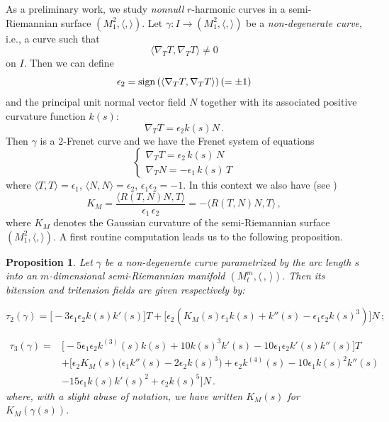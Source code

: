 \documentclass[11pt]{amsart}
\theoremstyle{plain}
\newtheorem{proposition}  [theorem]  {Proposition}
\theoremstyle{definition}
\numberwithin{equation}{section}
\begin{document}
As a preliminary work, we study \textit{nonnull} $r$-harmonic curves in a semi-Riemannian surface $(M^2_1, \langle,\rangle)$. Let $\gamma:I \to (M^2_1, \langle,\rangle)$ be a \textit{non-degenerate curve}, i.e., a curve such that
\[
\langle \nabla_T T,\nabla_T T\rangle \neq 0
\]
on $I$. Then we can define
\[
\epsilon_2={\rm sign}\left ( \langle \nabla_T T,\nabla_T T\rangle \right)(=\pm 1) 
\]
and the principal unit normal vector field $N$ together with its associated positive curvature function $k(s)$:
\[
\nabla_T T=\epsilon_2 k(s) N \,.
\]
Then $\gamma$ is a $2$-Frenet curve and we have the Frenet system of equations
\[
\begin{cases}
\nabla_T T=\epsilon_2 \,k(s) \,N \\
\nabla_T N=-\epsilon_1\,k(s) \,T
\end{cases}
\]
where $\langle T,T\rangle=\epsilon_1$, $\langle N,N\rangle=\epsilon_2$, $\epsilon_1 \epsilon_2=-1$. 
In this context we also have (see \cite{Neill})
\[
K_M = \frac{\langle R(T, N)N, T \rangle}{\epsilon_1 \, \epsilon_2}= - \langle R(T, N)N, T \rangle\,,
\]
where $K_M$ denotes the Gaussian curvature of the  semi-Riemannian surface $(M^2_1, \langle,\rangle)$. A first routine computation leads us to the following proposition.
\begin{proposition}\label{pro-general-curves-surfaces}
Let $\gamma$ be a non-degenerate curve parametrized by the arc length $s$ into an $m$-dimensional semi-Riemannian manifold $(M_t^m, \langle\, , \,\rangle)$. Then its bitension and tritension fields are given respectively by:

\begin{equation}\label{bitension-2-dim-surface}
\tau_2(\gamma)=\big [-3 \epsilon_1\epsilon_2  k(s) k'(s)\big ]T+\big [ \epsilon_2 \left(K_M(s) \epsilon_1 k(s)+k''(s)-\epsilon_1\epsilon_2 k(s)^3\right)\big ] N\,;
\end{equation}

\begin{equation}\label{tritension-2-dim-sueface}
\begin{aligned}
\tau_3(\gamma)=&\big [-5 \epsilon_1 \epsilon_2 k^{(3)}(s) k(s)+10  k(s)^3 k'(s)-10 \epsilon_1 \epsilon_2 k'(s) k''(s)\big ]T\\
&+\big [\epsilon_2 K_M(s) \big( \epsilon_1 k''(s)-2   \epsilon_2 k(s)^3\big) + \epsilon_2 k^{(4)}(s)-10 \epsilon_1  k(s)^2 k''(s)\\
&-15 \epsilon_1  k(s) k'(s)^2+ \epsilon_2k(s)^5\big ] N\,.
\end{aligned}
\end{equation}
where, with a slight abuse of notation, we have written $K_M(s)$ for $K_M(\gamma(s))$. 
\end{proposition}
\end{document}
